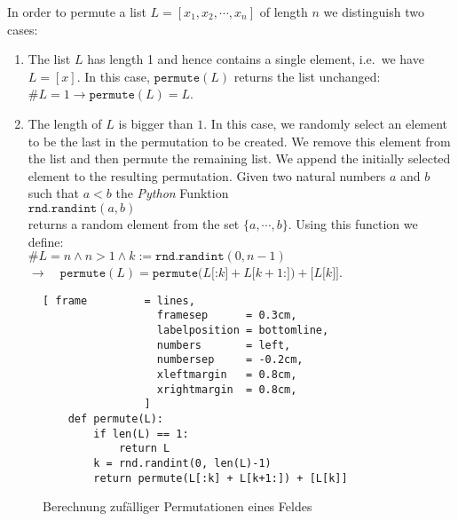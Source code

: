In order to permute a list $L = [x_1,x_2, \cdots, x_n]$ of length $n$ we distinguish two cases:
\begin{enumerate}
\item The list  $L$ has length 1 and hence contains a single element, i.e.~we have $L = [x]$.
      In this case,  $\texttt{permute}(L)$ returns the list unchanged:
      \\[0.2cm]
      \hspace*{1.3cm}
      $\#L = 1 \rightarrow \texttt{permute}(L) = L$.
\item The length of  $L$ is bigger than  $1$.  In this case, we randomly select an element to be the last in
      the permutation to be created.  We remove this element from the list and then permute the remaining list.  
      We append the initially selected element to the resulting permutation.
      Given two natural numbers $a$ and $b$ such that $a < b$ the \textsl{Python} Funktion
      \\[0.2cm]
      \hspace*{1.3cm}
      $\texttt{rnd.randint}(a,b)$
      \\[0.2cm]
      returns a random element from the set $\{a,\cdots,b\}$.  Using this function we define:
      \\[0.2cm]
      \hspace*{0.8cm}
      $\#L = n \wedge n > 1 \wedge k :=\texttt{rnd.randint}(0,n-1) $
      \\[0.2cm]
      \hspace*{2.3cm}
      $\rightarrow\quad  
         \texttt{permute}(L) = \texttt{permute}\bigl(L\texttt{[:}k\texttt{]} + L\texttt{[}k+1\texttt{:]}\bigr) + \texttt{[}L\texttt{[}k\texttt{]]}
      $.
\end{enumerate}

\begin{figure}[!ht]
\centering
\begin{Verbatim}[ frame         = lines, 
                  framesep      = 0.3cm, 
                  labelposition = bottomline,
                  numbers       = left,
                  numbersep     = -0.2cm,
                  xleftmargin   = 0.8cm,
                  xrightmargin  = 0.8cm,
                ]
    def permute(L):
        if len(L) == 1:
            return L
        k = rnd.randint(0, len(L)-1)
        return permute(L[:k] + L[k+1:]) + [L[k]]
\end{Verbatim}
\vspace*{-0.3cm}
\caption{Berechnung zuf\"alliger Permutationen eines Feldes}
\label{fig:Permutation.ipynb}
\end{figure}

